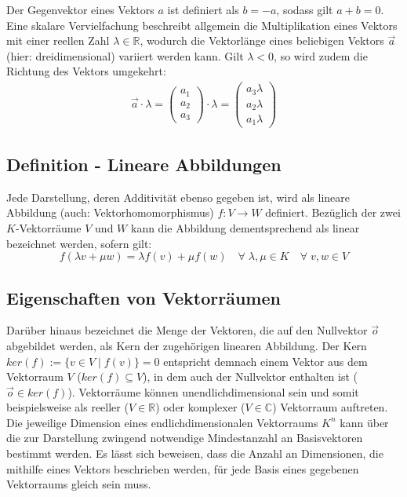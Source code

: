 \documentclass[]{dsadokumentation}
\begin{document}
Der Gegenvektor eines Vektors $a$ ist definiert als $b = -a$, sodass gilt $a + b = 0$. Eine skalare Vervielfachung beschreibt allgemein die Multiplikation eines Vektors mit einer reellen Zahl $\lambda \in \mathbb{R}$, wodurch die Vektorlänge eines beliebigen Vektors $\vec{a}$ (hier: dreidimensional) variiert werden kann. Gilt $\lambda < 0$, so wird zudem die Richtung des Vektors umgekehrt:
\begin{equation}
  \begin{aligned}
    \vec{a} \cdot \lambda = \left(\begin{array}{c} a_1 \\ a_2 \\ a_3 \end{array}\right)\cdot \lambda=\left(\begin{array}{c} a_3 \lambda \\ a_2 \lambda \\ a_1 \lambda \end{array}\right)
  \end{aligned}
\end{equation}

\subsection{Definition - Lineare Abbildungen}
Jede Darstellung, deren Additivität ebenso gegeben ist, wird als lineare Abbildung (auch: Vektorhomomorphismus) $f: V \rightarrow W$ definiert. Bezüglich der zwei $K$-Vektorräume $V$ und $W$ kann die Abbildung dementsprechend als linear bezeichnet werden, sofern gilt:
\begin{equation}
  f(\lambda v + \mu w)=\lambda f(v) + \mu f(w) \quad \forall \; \lambda, \mu \in K \quad \forall \; v, w \in V
\end{equation}

\subsection{Eigenschaften von Vektorräumen}
Darüber hinaus bezeichnet die Menge der Vektoren, die auf den Nullvektor $\vec{o}$ abgebildet werden, als Kern der zugehörigen linearen Abbildung. Der Kern $ker(f):= \{v \in V \; \big\vert \; f(v) \} = 0$ entspricht demnach einem Vektor aus dem Vektorraum $V$ ($ker(f) \subseteq V$), in dem auch der Nullvektor enthalten ist ($\vec{o} \in ker(f)$). Vektorräume können unendlichdimensional sein und somit beispielsweise als reeller ($V \in \mathbb{R}$) oder komplexer ($V \in \mathbb{C}$) Vektorraum auftreten. Die jeweilige Dimension eines endlichdimensionalen Vektorraums $K^n$ kann über die zur Darstellung zwingend notwendige Mindestanzahl an Basisvektoren bestimmt werden. Es lässt sich beweisen, dass die Anzahl an Dimensionen, die mithilfe eines Vektors beschrieben werden, für jede Basis eines gegebenen Vektorraums gleich sein muss.
\end{document}
